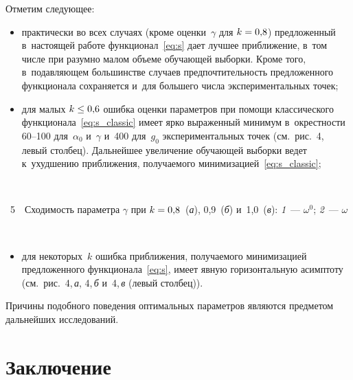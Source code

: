 \begin{multicols}{2}
Отметим следующее:
\begin{itemize}
  \item практически во всех случаях (кроме оценки~$\gamma$ для $k \hm= 0{,}8$)
    предложенный в~настоящей работе функционал~\eqref{eq:s}
    дает лучшее приближение, в~том числе при разумно малом объеме обуча\-ющей 
выборки. Кроме того, в~подав\-ля\-ющем большинстве случаев предпочтительность 
предложенного  функционала  сохраняется и~для большего числа экспериментальных точек;\\[-8pt]
  \item для малых $k \hm\leq 0{,}6$ ошибка оценки параметров при помощи классического
    функционала~\eqref{eq:s_classic} имеет ярко выраженный минимум 
    в~окрест\-ности 60--100 для~$\alpha_0$ и~$\gamma$ и~400 для~$g_0$ 
    экспериментальных точек  (см.\ рис.~4, левый столбец).
    Дальнейшее увеличение обучающей выборки ведет к~ухудшению приближения, 
получаемого минимизацией~\eqref{eq:s_classic};
 \end{itemize}
 

 { \begin{center}  %
 \vspace*{1pt}
 \mbox{%
\epsfxsize=70.982mm
}
\end{center}

\vspace*{-1pt}


\noindent
{{\figurename~5}\ \ \small{Сходимость параметра $\gamma$ при $k \hm= 0{,}8$~(\textit{а}),
    0,9~(\textit{б}) и~1,0~(\textit{в}): \textit{1}~--- $\omega^0$;
    \textit{2}~--- $\omega$}}
}

\vspace*{3pt}

\addtocounter{figure}{1}

\

\begin{itemize}
 \item для некоторых~$k$ ошибка приближения, получаемого минимизацией 
предложенного функционала~\eqref{eq:s}, имеет явную горизонтальную асимптоту 
(см.\ рис.~4,\,\textit{а}, 4,\,\textit{б} и~4,\,\textit{в} (левый столбец)).
\end{itemize}

Причины подобного поведения оптимальных параметров являются предметом
дальнейших исследований.

\section{Заключение}


\end{multicols}
